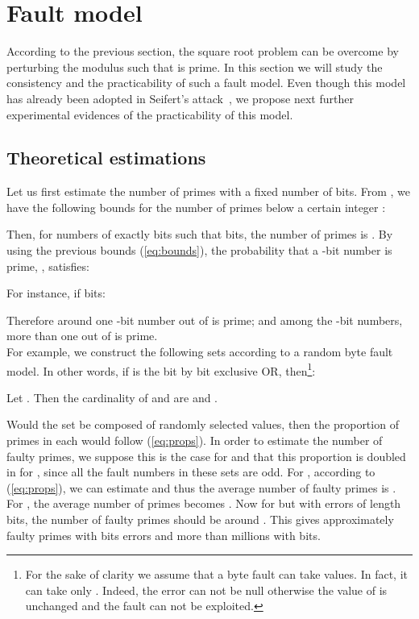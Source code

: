 \documentclass{article}
\begin{document}
\section{Fault model}
According to the previous section, the square root problem can be
overcome by perturbing the modulus  such that  is
prime. In this section we will study the consistency and the
practicability of such a fault model. Even though
 this model has already been adopted in Seifert's attack~\cite{13,67},
 we propose next further experimental evidences of the practicability
 of this model.
\subsection{Theoretical estimations}
\label{sec:prime_study}

Let us first estimate the number of primes with a fixed number of bits. From \cite[Theorem 1.10]{80}, we have the following bounds for the number of primes  below a certain integer :

Then, for numbers of exactly  bits such that  bits, the
number of primes is . By using the
previous bounds (\ref{eq:bounds}), the probability that a -bit
number is prime, , satisfies:

For instance, if  bits:

Therefore around one -bit number out of  is prime; and among the -bit numbers, more than one out of
 is prime.\\

For example, we construct the following sets  according to a random byte fault model.
In other words, if  is
the bit by bit exclusive OR, then\footnote[1]{For the sake of clarity
  we assume that a byte fault can take  values. In fact, it can
  take only . Indeed, the error can not be null otherwise the value of  is unchanged and the fault can not be exploited.}:

Let .
Then the cardinality of  and  are
 and . 

Would the set  be composed of randomly selected values,
then the proportion of primes in each  would follow
(\ref{eq:props}). 
In order to estimate the number of faulty primes,
we suppose this is the case for  and that this
proportion is doubled in  for , since all the
fault numbers in these sets are odd.
For , according to
(\ref{eq:props}), we can estimate  and thus the average number of
faulty primes is .
For , the average number of primes becomes
.
Now for  but with errors of length  bits, the number of
faulty primes should be around .
This gives approximately  faulty primes with  bits errors
and more than  millions with  bits.
\end{document}

